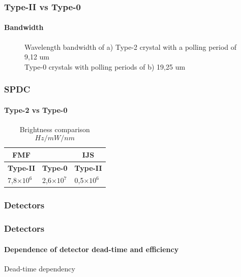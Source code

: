 \documentclass[serif,8pt]{beamer}
\begin{document}
{{\begin{frame}[t]
	\frametitle{Type-II vs Type-0}
	\framesubtitle{Bandwidth}
	
	\begin{figure}[!ht]
	  \centering
	  \caption{Wavelength bandwidth of a) Type-2 crystal with a polling period of 9,12 um\\ Type-0 crystals with polling periods of b) 19,25 um}
	  \quad
	  \pause
	  \label{fig:sub1}
	\end{figure}
\end{frame}

\begin{frame}
	\frametitle{SPDC}
	\framesubtitle{Type-2 vs Type-0}

	\begin{table}
		\begin{center}
		\caption{Brightness comparison \[Hz/mW/nm\]}
			\begin{tabular}[c|c|c]{|ll|l|}
				\hline
				\multicolumn{1}{|c}{\textbf{FMF}} & & 
				\multicolumn{1}{c|}{\textbf{IJS}} \\
				\hline 
				\multicolumn{1}{|c|}{\textbf{Type-II}} &
				\multicolumn{1}{c|}{\textbf{Type-0}} &
				\multicolumn{1}{c|}{\textbf{Type-II}} \\
				\hline
				7,8$\times10^6$ & 2,6$\times 10^7$ & 0,5$\times 10^6$\\
				\hline
			\end{tabular}
		\end{center}
	\end{table}

	\end{frame}

\subsubsection{Detectors}
\begin{frame}
	\frametitle{Detectors}
	\framesubtitle{Dependence of detector dead-time and efficiency}
Dead-time dependency
\end{frame}

}}
\end{document}
